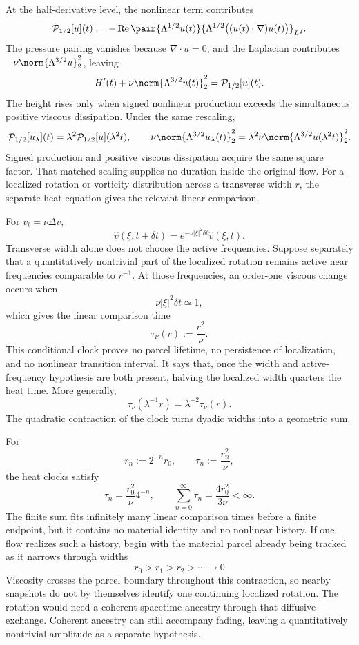 
At the half-derivative level, the nonlinear term contributes
\[
  \mathcal P_{1/2}[u](t)
  :=
  -\operatorname{Re}
  \pair
    {\Lambda^{1/2}u(t)}
    {\Lambda^{1/2}\bigl((u(t)\cdot\nabla)u(t)\bigr)}_{L^2}.
\]
The pressure pairing vanishes because \(\nabla\cdot u=0\), and the Laplacian contributes \(-\nu\norm{\Lambda^{3/2}u}_2^2\), leaving
\[
  H'(t)
  +
  \nu\norm{\Lambda^{3/2}u(t)}_2^2
  =
  \mathcal P_{1/2}[u](t).
\]
The height rises only when signed nonlinear production exceeds the simultaneous positive viscous dissipation. Under the same rescaling,
\[
  \mathcal P_{1/2}[u_\lambda](t)
  =
  \lambda^2\mathcal P_{1/2}[u](\lambda^2t),
  \qquad
  \nu\norm{\Lambda^{3/2}u_\lambda(t)}_2^2
  =
  \lambda^2\nu\norm{\Lambda^{3/2}u(\lambda^2t)}_2^2.
\]
Signed production and positive viscous dissipation acquire the same square factor. That matched scaling supplies no duration inside the original flow. For a localized rotation or vorticity distribution across a transverse width \(r\), the separate heat equation gives the relevant linear comparison.


For \(v_t=\nu\Delta v\),
\[
  \widehat v(\xi,t+\delta t)
  =
  e^{-\nu|\xi|^2\delta t}\widehat v(\xi,t).
\]
Transverse width alone does not choose the active frequencies. Suppose separately that a quantitatively nontrivial part of the localized rotation remains active near frequencies comparable to \(r^{-1}\). At those frequencies, an order-one viscous change occurs when
\[
  \nu|\xi|^2\delta t\simeq1,
\]
which gives the linear comparison time
\[
  \tau_\nu(r)
  :=
  \frac{r^2}{\nu}.
\]
This conditional clock proves no parcel lifetime, no persistence of localization, and no nonlinear transition interval. It says that, once the width and active-frequency hypothesis are both present, halving the localized width quarters the heat time. More generally,
\[
  \tau_\nu(\lambda^{-1}r)
  =
  \lambda^{-2}\tau_\nu(r).
\]
The quadratic contraction of the clock turns dyadic widths into a geometric sum.


For
\[
  r_n:=2^{-n}r_0,
  \qquad
  \tau_n:=\frac{r_n^2}{\nu},
\]
the heat clocks satisfy
\[
  \tau_n
  =
  \frac{r_0^2}{\nu}4^{-n},
  \qquad
  \sum_{n=0}^{\infty}\tau_n
  =
  \frac{4r_0^2}{3\nu}
  <
  \infty.
\]
The finite sum fits infinitely many linear comparison times before a finite endpoint, but it contains no material identity and no nonlinear history. If one \NavierStokes{} flow realizes such a history, begin with the material parcel already being tracked as it narrows through widths
\[
  r_0>r_1>r_2>\cdots\longrightarrow0
\]
Viscosity crosses the parcel boundary throughout this contraction, so nearby snapshots do not by themselves identify one continuing localized rotation. The rotation would need a coherent spacetime ancestry through that diffusive exchange. Coherent ancestry can still accompany fading, leaving a quantitatively nontrivial amplitude as a separate hypothesis.


